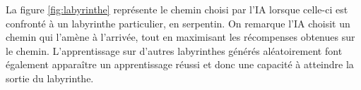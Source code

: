 La figure \ref{fig:labyrinthe} représente le chemin choisi par l'IA lorsque celle-ci est confronté à un labyrinthe particulier, en serpentin. On remarque l'IA choisit
un chemin qui l'amène à l'arrivée, tout en maximisant les récompenses obtenues sur le chemin. L'apprentissage sur d'autres labyrinthes générés aléatoirement
font également apparaître un apprentissage réussi et donc une capacité à atteindre la sortie du labyrinthe.

